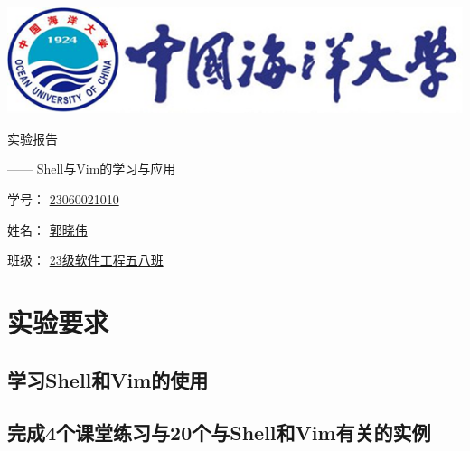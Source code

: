 \documentclass[UTF8,a4paper]{ctexart}
\begin{document}
\begin{sloppypar}


	\begin{center}
	\includegraphics[width = 14cm]{picture/s1}

		\begin{fontsize}{60pt}{20pt}
			实验报告
		\end{fontsize}

		\bigskip
		\bigskip
		
		\begin{fontsize}{20pt}{20pt}
			\begin{flushright}
				—— {\Huge Shell}与{\Huge Vim}的学习与应用
			\end{flushright}
		\end{fontsize}
		
		\bigskip
		\bigskip
		\bigskip
		\bigskip
		\bigskip
		\bigskip
		\bigskip
		\bigskip
		\bigskip
		\bigskip
		\bigskip
		\bigskip
		\bigskip
		\bigskip
		\bigskip
		\bigskip
		
		\begin{fontsize}{25pt}{20pt}

			学号：
			\underline{{\huge 23060021010}}
			\bigskip
			\bigskip
			\bigskip
			\bigskip

			姓名：
			\underline{郭晓伟}
			\bigskip
			\bigskip
			\bigskip
			\bigskip

			班级：
			\underline{{\Huge 23}级软件工程五八班}
				
		\end{fontsize}
	\end{center}
	\section{实验要求}
	\subsection{学习Shell和Vim的使用}
	\subsection{完成4个课堂练习与20个与Shell和Vim有关的实例}

			\bigskip
			\bigskip
			\bigskip
			\bigskip


\end{sloppypar}
\end{document}
